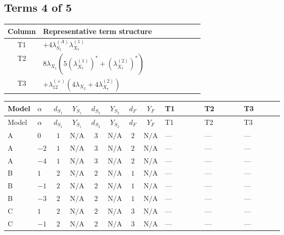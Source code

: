 \documentclass[8pt]{article}
\begin{document}
\begin{landscape}
\subsection*{Terms 4 of 5}
\begin{center}
\begin{tabular}{@{}c >{\raggedright\arraybackslash}p{0.82\linewidth}@{}}
\toprule
Column & Representative term structure \\
\midrule
T1 & \(\displaystyle +4 {\lambda_{S_1}^{(A)}} {\lambda_{X_{7}}^{(1)}}\) \\
\midrule
T2 & \(\displaystyle 8 {\lambda_{X_{1}}} (5 \left({\lambda_{X_{7}}^{(1)}}\right)^{*}+\left({\lambda_{X_{7}}^{(2)}}\right)^{*})\) \\
\midrule
T3 & \(\displaystyle +{\lambda_{12}^{(\times)}} (4 {\lambda_{X_{2}}}+4 {\lambda_{X_{7}}^{(2)}})\) \\
\midrule
\bottomrule
\end{tabular}
\end{center}
\smallskip
\tiny
\begin{longtable}{@{}llcccccc >{\raggedright\arraybackslash}p{0.21\linewidth} >{\raggedright\arraybackslash}p{0.21\linewidth} >{\raggedright\arraybackslash}p{0.21\linewidth}@{}}
\toprule
Model & $\alpha$ & $d_{S_1}$ & $Y_{S_1}$ & $d_{S_2}$ & $Y_{S_2}$ & $d_F$ & $Y_F$ & T1 & T2 & T3 \\
\midrule
\endfirsthead
\toprule
Model & $\alpha$ & $d_{S_1}$ & $Y_{S_1}$ & $d_{S_2}$ & $Y_{S_2}$ & $d_F$ & $Y_F$ & T1 & T2 & T3 \\
\midrule
\endhead
A & $0$ & $1$ & $\text{N/A}$ & $3$ & $\text{N/A}$ & $2$ & $\text{N/A}$ & --- & --- & --- \\
\midrule
A & $-2$ & $1$ & $\text{N/A}$ & $3$ & $\text{N/A}$ & $2$ & $\text{N/A}$ & --- & --- & --- \\
\midrule
A & $-4$ & $1$ & $\text{N/A}$ & $3$ & $\text{N/A}$ & $2$ & $\text{N/A}$ & --- & --- & --- \\
\midrule
B & $1$ & $2$ & $\text{N/A}$ & $2$ & $\text{N/A}$ & $1$ & $\text{N/A}$ & --- & --- & --- \\
\midrule
B & $-1$ & $2$ & $\text{N/A}$ & $2$ & $\text{N/A}$ & $1$ & $\text{N/A}$ & --- & --- & --- \\
\midrule
B & $-3$ & $2$ & $\text{N/A}$ & $2$ & $\text{N/A}$ & $1$ & $\text{N/A}$ & --- & --- & --- \\
\midrule
C & $1$ & $2$ & $\text{N/A}$ & $2$ & $\text{N/A}$ & $3$ & $\text{N/A}$ & --- & --- & --- \\
\midrule
C & $-1$ & $2$ & $\text{N/A}$ & $2$ & $\text{N/A}$ & $3$ & $\text{N/A}$ & --- & --- & --- \\

\end{longtable}
\end{landscape}
\end{document}
